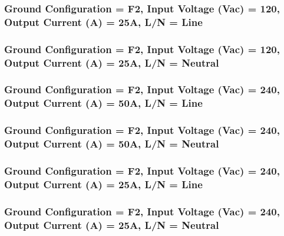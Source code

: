 \begin{center}

\end{center}



\subsubsection{Ground Configuration = F2, Input Voltage (Vac) = 120, Output Current (A) = 25A, L/N = Line}

\begin{center}

\end{center}



\subsubsection{Ground Configuration = F2, Input Voltage (Vac) = 120, Output Current (A) = 25A, L/N = Neutral}

\begin{center}

\end{center}



\subsubsection{Ground Configuration = F2, Input Voltage (Vac) = 240, Output Current (A) = 50A, L/N = Line}

\begin{center}

\end{center}



\subsubsection{Ground Configuration = F2, Input Voltage (Vac) = 240, Output Current (A) = 50A, L/N = Neutral}

\begin{center}

\end{center}



\subsubsection{Ground Configuration = F2, Input Voltage (Vac) = 240, Output Current (A) = 25A, L/N = Line}

\begin{center}

\end{center}



\subsubsection{Ground Configuration = F2, Input Voltage (Vac) = 240, Output Current (A) = 25A, L/N = Neutral}

\begin{center}

\end{center}



